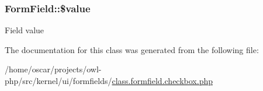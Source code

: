 \subsubsection[{\$value}]{\setlength{\rightskip}{0pt plus 5cm}FormField::\$value}\label{classFormField_a3c01e89834248eec8e2f145fbcfa0fbc}
Field value 

The documentation for this class was generated from the following file:\begin{DoxyCompactItemize}
\item 
/home/oscar/projects/owl-\/php/src/kernel/ui/formfields/\hyperlink{class_8formfield_8checkbox_8php}{class.formfield.checkbox.php}\end{DoxyCompactItemize}
